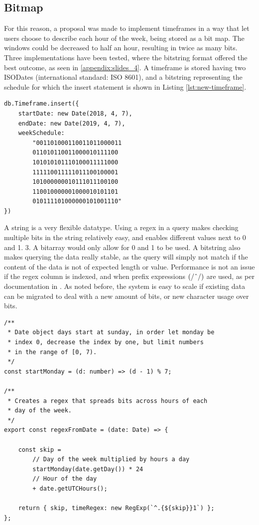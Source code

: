 \subsection{Bitmap}
For this reason, a proposal was made to implement timeframes in a way that let users choose to describe each hour of the week, being stored as a bit map. The windows could be decreased to half an hour, resulting in twice as many bits. Three implementations have been tested, where the bitstring format offered the best outcome, as seen in \ref{appendix:slides_4}. A timeframe is stored having two ISODates (international standard: ISO 8601), and a bitstring representing the schedule for which the insert statement is shown in Listing \ref{lst:new-timeframe}.

\begin{center}
	\noindent\begin{minipage}{.45\textwidth}
		\begin{lstlisting}[caption={Improved timeframe.}, label={lst:new-timeframe}]
db.Timeframe.insert({
	startDate: new Date(2018, 4, 7),
	endDate: new Date(2019, 4, 7),
	weekSchedule:
		"001101000110011011000011
		011010110011000010111100
		101010101110100011111000
		111110011111011100100001
		101000000010111011100100
		110010000001000010101101
		010111101000000101001110"
})
\end{lstlisting}
	\end{minipage}
\end{center}

A string is a very flexible datatype. Using a regex in a query makes checking multiple bits in the string relatively easy, and enables different values next to 0 and 1. 3. A bitarray would only allow for 0 and 1 to be used. A bitstring also makes querying the data really stable, as the query will simply not match if the content of the data is not of expected length or value. Performance is not an issue if the regex column is indexed, and when prefix expressions $(/\string^/)$ are used, as per documentation in \cite{MongoDB-Regex}. As noted before, the system is easy to scale if existing data can be migrated to deal with a new amount of bits, or new character usage over bits.

\begin{lstlisting}[caption={Opening timeframe.}, label={lst:open-timeframe}]
/**
 * Date object days start at sunday, in order let monday be
 * index 0, decrease the index by one, but limit numbers
 * in the range of [0, 7).
 */
const startMonday = (d: number) => (d - 1) % 7;

/**
 * Creates a regex that spreads bits across hours of each
 * day of the week.
 */
export const regexFromDate = (date: Date) => {

	const skip =
		// Day of the week multiplied by hours a day
		startMonday(date.getDay()) * 24
		// Hour of the day
		+ date.getUTCHours();

	return { skip, timeRegex: new RegExp(`^.{${skip}}1`) };
};
\end{lstlisting}

